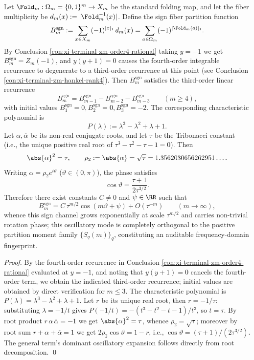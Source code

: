 \begin{conclusion}\label{con:xi-terminal-signed-fiber-partition-recurrence}
Let \(\Fold_m:\Omega_m=\{0,1\}^m\to X_m\) be the standard folding map, and let the fiber multiplicity be \(d_m(x):=|\Fold_m^{-1}(x)|\).
Define the sign fiber partition function
\[
B_m^{\mathrm{sgn}}:=\sum_{x\in X_m}(-1)^{|x|_1}\,d_m(x)
=\sum_{a\in\Omega_m}(-1)^{|\Fold_m(a)|_1}.
\]
By Conclusion \ref{con:xi-terminal-zm-order4-rational} taking \(y=-1\) we get \(B_m^{\mathrm{sgn}}=Z_m(-1)\),
and \(y(y+1)=0\) causes the fourth-order integrable recurrence to degenerate to a third-order recurrence at this point (see Conclusion \ref{con:xi-terminal-zm-hankel-rank4}).
Then \(B_m^{\mathrm{sgn}}\) satisfies the third-order linear recurrence
\[
B_m^{\mathrm{sgn}}=B_{m-1}^{\mathrm{sgn}}-B_{m-2}^{\mathrm{sgn}}-B_{m-3}^{\mathrm{sgn}}\qquad(m\ge 4),
\]
with initial values \(B_1^{\mathrm{sgn}}=0,B_2^{\mathrm{sgn}}=0,B_3^{\mathrm{sgn}}=-2\).
The corresponding characteristic polynomial is
\[
P(\lambda):=\lambda^3-\lambda^2+\lambda+1.
\]
Let \(\alpha,\overline{\alpha}\) be its non-real conjugate roots, and let \(\tau\) be the Tribonacci constant (i.e., the unique positive real root of \(\tau^3-\tau^2-\tau-1=0\)).
Then
\[
\abs{\alpha}^2=\tau,
\qquad
\rho_2:=\abs{\alpha}=\sqrt{\tau}=1.3562030656262951\ldots .
\]
Writing \(\alpha=\rho_2 e^{i\vartheta}\) (\(\vartheta\in(0,\pi)\)), the phase satisfies
\[
\cos\vartheta=\frac{\tau+1}{2\tau^{3/2}}.
\]
Therefore there exist constants \(C\neq 0\) and \(\psi\in\RR\) such that
\[
B_m^{\mathrm{sgn}}=C\,\tau^{m/2}\cos(m\vartheta+\psi)+O(\tau^{-m})\qquad(m\to\infty),
\]
whence this sign channel grows exponentially at scale \(\tau^{m/2}\) and carries non-trivial rotation phase; this oscillatory mode is completely orthogonal to the positive partition moment family \(\{S_q(m)\}_q\), constituting an auditable frequency-domain fingerprint.
\end{conclusion}
\begin{proof}
By the fourth-order recurrence in Conclusion \ref{con:xi-terminal-zm-order4-rational} evaluated at \(y=-1\), and noting that \(y(y+1)=0\) cancels the fourth-order term,
we obtain the indicated third-order recurrence; initial values are obtained by direct verification for \(m\le 3\).
The characteristic polynomial is \(P(\lambda)=\lambda^3-\lambda^2+\lambda+1\).
Let \(r\) be its unique real root, then \(r=-1/\tau\): substituting \(\lambda=-1/t\) gives \(P(-1/t)=-(t^3-t^2-t-1)/t^3\), so \(t=\tau\).
By root product \(r\,\alpha\,\overline{\alpha}=-1\) we get \(\abs{\alpha}^2=\tau\), whence \(\rho_2=\sqrt{\tau}\);
moreover by root sum \(r+\alpha+\overline{\alpha}=1\) we get \(2\rho_2\cos\vartheta=1-r\), i.e., \(\cos\vartheta=(\tau+1)/(2\tau^{3/2})\).
The general term's dominant oscillatory expansion follows directly from root decomposition. \qed
\end{proof}

